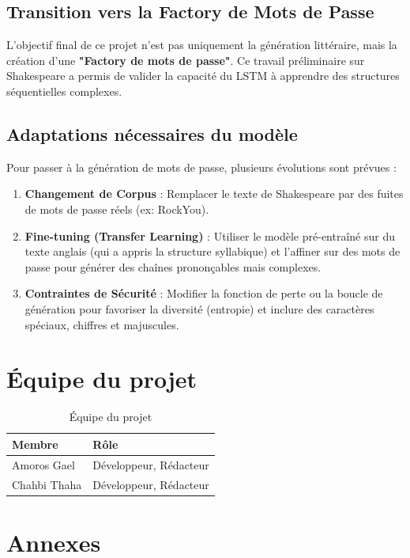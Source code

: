 \documentclass[a4paper]{article}
\begin{document}
\subsection{Transition vers la Factory de Mots de Passe}
L'objectif final de ce projet n'est pas uniquement la génération littéraire, mais la création d'une \textbf{"Factory de mots de passe"}. Ce travail préliminaire sur Shakespeare a permis de valider la capacité du LSTM à apprendre des structures séquentielles complexes.

\subsection{Adaptations nécessaires du modèle}
Pour passer à la génération de mots de passe, plusieurs évolutions sont prévues :
\begin{enumerate}
    \item \textbf{Changement de Corpus} : Remplacer le texte de Shakespeare par des fuites de mots de passe réels (ex: RockYou).
    \item \textbf{Fine-tuning (Transfer Learning)} : Utiliser le modèle pré-entraîné sur du texte anglais (qui a appris la structure syllabique) et l'affiner sur des mots de passe pour générer des chaînes prononçables mais complexes.
    \item \textbf{Contraintes de Sécurité} : Modifier la fonction de perte ou la boucle de génération pour favoriser la diversité (entropie) et inclure des caractères spéciaux, chiffres et majuscules.
\end{enumerate}



\section{Équipe du projet}
\begin{table}[h]
\caption{Équipe du projet}
\label{tab:equipe}
\centering
\begin{tabular}{ll}
\toprule
\textbf{Membre} & \textbf{Rôle} \\
\midrule
Amoros Gael & Développeur, Rédacteur \\
Chahbi Thaha & Développeur, Rédacteur \\
\bottomrule
\end{tabular}
\end{table}

\section{Annexes}
\end{document}
